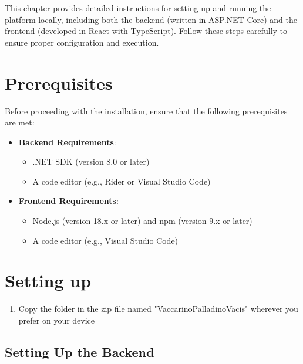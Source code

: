 This chapter provides detailed instructions for setting up and running the platform locally, including both the backend (written in ASP.NET Core) and the frontend (developed in React with TypeScript). Follow these steps carefully to ensure proper configuration and execution.

\section{Prerequisites}

Before proceeding with the installation, ensure that the following prerequisites are met:
\begin{itemize}
    \item \textbf{Backend Requirements}:
    \begin{itemize}
        \item .NET SDK (version 8.0 or later)
        \item A code editor (e.g., Rider or Visual Studio Code)
    \end{itemize}
    \item \textbf{Frontend Requirements}:
    \begin{itemize}
        \item Node.js (version 18.x or later) and npm (version 9.x or later)
        \item A code editor (e.g., Visual Studio Code)
    \end{itemize}
\end{itemize}

\section{Setting up}

\begin{enumerate}
    \item Copy the folder in the zip file named "VaccarinoPalladinoVacis" wherever you prefer on your device
\end{enumerate}

\subsection{Setting Up the Backend}

